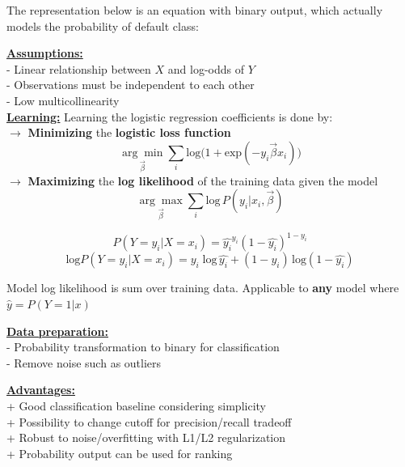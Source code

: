 \documentclass[letterpaper, 10.5pt,landscape]{article}
\begin{document}
\begin{multicols*}{3}
\vspace{-5pt}
The representation below is an equation with binary output, which actually models the probability of default class: 


\vspace{2pt}
\textbf{\underline{Assumptions:}} \\
- Linear relationship between $X$ and log-odds of $Y$ \\
- Observations must be independent to each other \\
- Low multicollinearity \\



\vspace{2pt}
\textbf{\underline{Learning:}} Learning the logistic regression coefficients is done by: \\

$\rightarrow$ \textbf{Minimizing} the \textbf{logistic loss function} 
\vspace{-5pt}
\[\boxed{\underset{\vec{\beta}} {\arg\min} \sum_{i} \text{log}\big(1+\text{exp}(-y_{i} \vec{\beta}x_{i}) \big)} \] 
$\rightarrow$ \textbf{Maximizing} the \textbf{log likelihood} of the training data given the model 
\vspace{-5pt}
\[\boxed{\underset{\vec{\beta}} {\arg\max} \sum_{i} \text{log} \hspace{2pt} P\left(y_{i} | x_{i}, \vec{\beta} \right)} \]

\[P \left(Y=y_{i} | X=x_{i} \right) = \hat{y_{i}}^{y_{i}} \left(1- \hat{y_{i}}\right)^{1-y_{i}}  \]
\vspace{-10pt}
\[\text{log} P \left(Y=y_{i} | X=x_{i} \right) = y_{i} \; \text{log}\,  \hat{y_{i}} +  (1-y_{i}) \, \text{log}\left(1- \hat{y_{i}}\right)  \]

Model log likelihood is sum over training data. Applicable to \textbf{any} model where \(\hat{y} = P(Y=1 |x) \) 




\textbf{\underline{Data preparation:}}\\
- Probability transformation to binary for classification \\
- Remove noise such as outliers

\vspace{2pt}
\textbf{\underline{Advantages:}} \\
+ Good classification baseline considering simplicity \\
+ Possibility to change cutoff for precision/recall tradeoff \\
+ Robust to noise/overfitting with L1/L2 regularization \\
+ Probability output can be used for ranking  


\end{multicols*}
\end{document}
